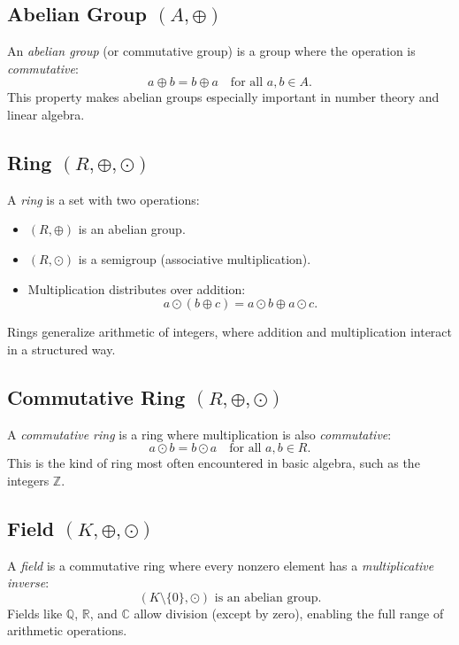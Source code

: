 \subsection{Abelian Group \((A, \oplus)\)}
An \emph{abelian group} (or commutative group) is a group where the operation is \emph{commutative}:
\[
a \oplus b = b \oplus a \quad \text{for all } a, b \in A.
\]
This property makes abelian groups especially important in number theory and linear algebra.

\subsection{Ring \((R, \oplus, \odot)\)}
A \emph{ring} is a set with two operations:
\begin{itemize}[label=\(-\)]
  \item \((R, \oplus)\) is an abelian group.
  \item \((R, \odot)\) is a semigroup (associative multiplication).
  \item Multiplication distributes over addition:
  \[
  a \odot (b \oplus c) = a \odot b \oplus a \odot c.
  \]
\end{itemize}
Rings generalize arithmetic of integers, where addition and multiplication interact in a structured way.

\subsection{Commutative Ring \((R, \oplus, \odot)\)}
A \emph{commutative ring} is a ring where multiplication is also \emph{commutative}:
\[
a \odot b = b \odot a \quad \text{for all } a, b \in R.
\]
This is the kind of ring most often encountered in basic algebra, such as the integers \(\mathbb{Z}\).

\subsection{Field \((K, \oplus, \odot)\)}
A \emph{field} is a commutative ring where every nonzero element has a \emph{multiplicative inverse}:
\[
(K \setminus \{0\}, \odot) \text{ is an abelian group}.
\]
Fields like \(\mathbb{Q}\), \(\mathbb{R}\), and \(\mathbb{C}\) allow division (except by zero), enabling the full range of arithmetic operations.

